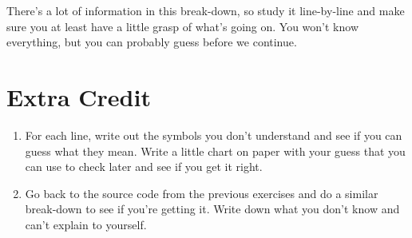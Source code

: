 There's a lot of information in this break-down, so study it line-by-line
and make sure you at least have a little grasp of what's going on.  You
won't know everything, but you can probably guess before we continue.

\section{Extra Credit}

\begin{enumerate}
\item For each line, write out the symbols you don't understand and
    see if you can guess what they mean.  Write a little chart on 
    paper with your guess that you can use to check later and see
    if you get it right.
\item Go back to the source code from the previous exercises and
    do a similar break-down to see if you're getting it.  Write down
    what you don't know and can't explain to yourself.
\end{enumerate}


